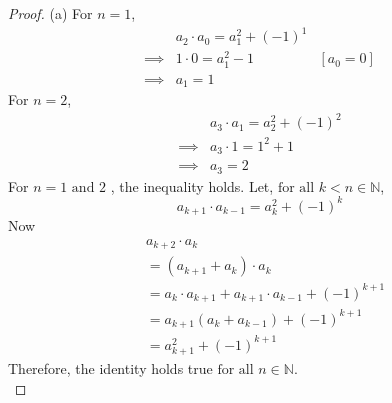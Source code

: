 \documentclass[12pt]{article}
\begin{document}
\begin{proof}
(a) For $n = 1$,
\begin{align*}
& a_2\cdot a_0 = a_1^2 + (-1)^1 \\
\implies & 1\cdot 0 = a_1^2 - 1 & [a_0 = 0] \\
\implies & a_1 = 1
\end{align*}
For $n = 2$,
\begin{align*}
& a_3\cdot a_1 = a_2^2 + (-1)^2 \\
\implies & a_3 \cdot 1 = 1^2 + 1 \\
\implies & a_3 = 2
\end{align*}
For $n = 1 \text{ and } 2$ , the inequality holds. Let, $\text{for all } k < n \in \mathbb{N}$,
\[
a_{k+1}\cdot a_{k-1} = a_k^2 + (-1)^k
\]
Now
\begin{align*}
& a_{k+2}\cdot a_k \\
& = (a_{k+1} + a_k) \cdot a_k \\
& = a_k \cdot a_{k+1} + a_{k+1}\cdot a_{k-1} + (-1)^{k+1} \\
& = a_{k+1}(a_k + a_{k-1}) + (-1)^{k+1} \\
& = a_{k+1}^2 + (-1)^{k+1}
\end{align*}
Therefore, the identity holds true $\text{for all } n \in \mathbb{N}$.\\


\end{proof}
\end{document}
